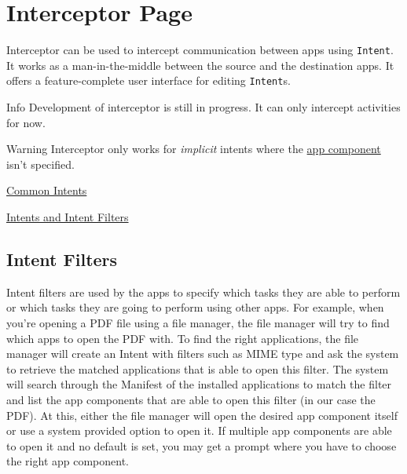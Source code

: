 \section{Interceptor Page}\label{sec:interceptor-page} %
Interceptor can be used to intercept communication between apps using \texttt{Intent}. It works as a man-in-the-middle
between the source and the destination apps. It offers a feature-complete user interface for editing \texttt{Intent}s.

\begin{tip}{Info}
    Development of interceptor is still in progress. It can only intercept activities for now.
\end{tip}

\begin{warning}{Warning}
    Interceptor only works for \textit{implicit} intents where the \hyperref[subsec:faq:what-are-app-components]{app
    component} isn't specified.
\end{warning}

\begin{amseealso}
    \item \href{https://developer.android.com/guide/components/intents-common}{Common Intents}
    \item \href{https://developer.android.com/guide/components/intents-filters}{Intents and Intent Filters}
\end{amseealso}

\subsection{Intent Filters}\label{subsec:intent-filters} %
Intent filters are used by the apps to specify which tasks they are able to perform or which tasks they are going to
perform using other apps. For example, when you're opening a PDF file using a file manager, the file manager will try
to find which apps to open the PDF with. To find the right applications, the file manager will create an Intent with
filters such as MIME type and ask the system to retrieve the matched applications that is able to open this filter.
The system will search through the Manifest of the installed applications to match the filter and list the app
components that are able to open this filter (in our case the PDF). At this, either the file manager will open the
desired app component itself or use a system provided option to open it. If multiple app components are able to open it
and no default is set, you may get a prompt where you have to choose the right app component.

